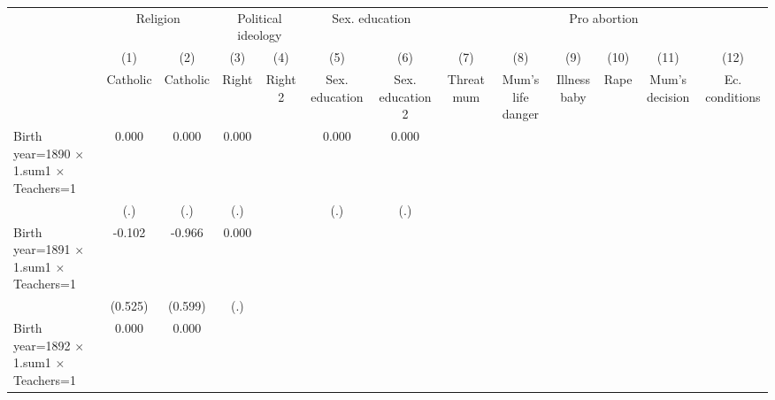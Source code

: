 {
\def\sym#1{\ifmmode^{#1}\else\(^{#1}\)\fi}
\begin{tabular}{l*{12}{c}}
\hline\hline
                    &\multicolumn{2}{c}{Religion}   &\multicolumn{2}{c}{Political ideology}&\multicolumn{2}{c}{Sex. education}&\multicolumn{6}{c}{Pro abortion}                                                               \\\cmidrule(lr){2-3}\cmidrule(lr){4-5}\cmidrule(lr){6-7}\cmidrule(lr){8-13}
                    &\multicolumn{1}{c}{(1)}&\multicolumn{1}{c}{(2)}&\multicolumn{1}{c}{(3)}&\multicolumn{1}{c}{(4)}&\multicolumn{1}{c}{(5)}&\multicolumn{1}{c}{(6)}&\multicolumn{1}{c}{(7)}&\multicolumn{1}{c}{(8)}&\multicolumn{1}{c}{(9)}&\multicolumn{1}{c}{(10)}&\multicolumn{1}{c}{(11)}&\multicolumn{1}{c}{(12)}\\
                    &\multicolumn{1}{c}{Catholic}&\multicolumn{1}{c}{Catholic}&\multicolumn{1}{c}{Right}&\multicolumn{1}{c}{Right 2}&\multicolumn{1}{c}{Sex. education}&\multicolumn{1}{c}{Sex. education 2}&\multicolumn{1}{c}{Threat mum}&\multicolumn{1}{c}{Mum's life danger}&\multicolumn{1}{c}{Illness baby}&\multicolumn{1}{c}{Rape}&\multicolumn{1}{c}{Mum's decision}&\multicolumn{1}{c}{Ec. conditions}\\
\hline
Birth year=1890 $\times$ 1.sum1 $\times$ Teachers=1&       0.000   &       0.000   &       0.000   &               &       0.000   &       0.000   &               &               &               &               &               &               \\
                    &         (.)   &         (.)   &         (.)   &               &         (.)   &         (.)   &               &               &               &               &               &               \\
Birth year=1891 $\times$ 1.sum1 $\times$ Teachers=1&      -0.102   &      -0.966   &       0.000   &               &               &               &               &               &               &               &               &               \\
                    &     (0.525)   &     (0.599)   &         (.)   &               &               &               &               &               &               &               &               &               \\
Birth year=1892 $\times$ 1.sum1 $\times$ Teachers=1&       0.000   &       0.000   &               &               &               &               &               &               &               &               &               &               \\

\end{tabular}}
